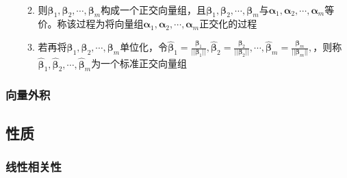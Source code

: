 \documentclass[12pt]{book}
\begin{document}
\begin{enumerate}[1.]
\begin{enumerate}[(1)]
\begin{align*}
                    \end{align*}
              \item 则$\bm{\beta}_{1},\bm{\beta}_{2},\cdots,\bm{\beta}_{m}$构成一个正交向量组，且$\bm{\beta}_{1},\bm{\beta}_{2},\cdots,\bm{\beta}_{m}$与$\bm{\alpha}_{1},\bm{\alpha}_{2},\cdots,\bm{\alpha}_{m}$等价。称该过程为将向量组$\bm{\alpha}_{1},\bm{\alpha}_{2},\cdots,\bm{\alpha}_{m}$正交化的过程
              \item 若再将$\bm{\beta}_{1},\bm{\beta}_{2},\cdots,\bm{\beta}_{m}$单位化，令$\hat{\bm{\beta}}_{1}=\frac{\bm{\beta}_1}{||\bm{\beta}_1||}, \hat{\bm{\beta}}_{2}=\frac{\bm{\beta}_2}{||\bm{\beta}_2||}, \cdots, \hat{\bm{\beta}}_{m}=\frac{\bm{\beta}_m}{||\bm{\beta}_m||},$，则称$\hat{\bm{\beta}}_{1}, \hat{\bm{\beta}}_{2}, \cdots, \hat{\bm{\beta}}_{m}$为一个标准正交向量组
          \end{enumerate}
\end{enumerate}


\subsubsection{向量外积}
















\subsection{性质}



\subsubsection{线性相关性}
\end{document}

